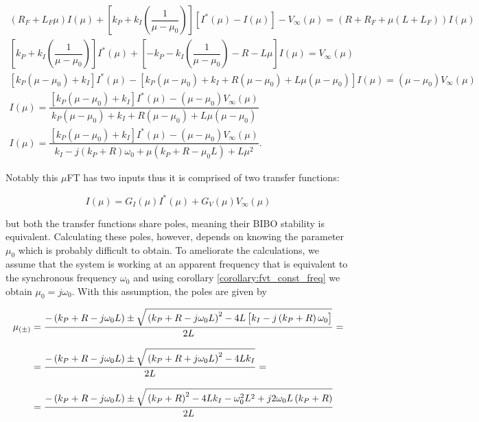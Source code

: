 \begin{gather}
	\left(R_F + L_F\mu\right)I(\mu) + \left[k_P + k_I\left(\dfrac{1}{\mu - \mu_0}\right)\right]\left[I^*(\mu) - I(\mu)\right] - V_\infty(\mu) = \left(R + R_F + \mu\left(L + L_F\right)\right)I(\mu) \nonumber\\[3mm]
	\left[k_P + k_I\left(\dfrac{1}{\mu - \mu_0}\right)\right]I^*(\mu) + \left[- k_P - k_I\left(\dfrac{1}{\mu - \mu_0}\right) - R - L\mu \right]I(\mu) = V_\infty(\mu) \nonumber\\[3mm]
	\left[k_P\left(\mu - \mu_0\right) + k_I\right]I^*(\mu) - \left[k_P\left(\mu - \mu_0\right) + k_I  + R\left(\mu - \mu_0\right) + L\mu\left(\mu - \mu_0\right)\right]I(\mu) = \left(\mu - \mu_0\right) V_\infty(\mu)   \nonumber\\[3mm]
	I(\mu) = \dfrac{\left[k_P\left(\mu - \mu_0\right) + k_I\right]I^*(\mu) - \left(\mu - \mu_0\right) V_\infty(\mu)}{k_P\left(\mu - \mu_0\right) + k_I  + R\left(\mu - \mu_0\right) + L\mu\left(\mu - \mu_0\right)} \nonumber\\[3mm]
	I(\mu) = \dfrac{\left[k_P\left(\mu - \mu_0\right) + k_I\right]I^*(\mu) - \left(\mu - \mu_0\right) V_\infty(\mu)}{ k_I - j \left(k_P + R\right) \omega_0 + \mu\left(k_P + R - \mu_0 L\right) + L\mu^2 } .\label{eq:dpo_i_mimo}
\end{gather}

	Notably this $\mu$FT has two inputs thus it is comprised of two transfer functions:

\begin{equation} I(\mu) = G_I(\mu) I^*(\mu) + G_V(\mu) V_\infty(\mu) \end{equation}

	\noindent but both the transfer functions share poles, meaning their BIBO stability is equivalent. Calculating these poles, however, depends on knowing the parameter $\mu_0$ which is probably difficult to obtain. To ameliorate the calculations, we assume that the system is working at an apparent frequency that is equivalent to the synchronous frequency $\omega_0$ and using corollary \ref{corollary:fvt_const_freq} we obtain $\mu_0 = j\omega_0$. With this assumption, the poles are given by

\begin{align}
	\mu_{(\pm)} &= \dfrac{-\left(k_P + R - j\omega_0 L\right) \pm \sqrt{\raisebox{3.5mm}{} \left(k_P + R - j\omega_0 L\right)^2 - 4L\left[\raisebox{3mm}{} k_I - j \left(k_P + R\right) \omega_0 \right]}}{2L} = \nonumber\\[3mm]
%
	            &= \dfrac{-\left(k_P + R - j\omega_0 L\right) \pm \sqrt{\raisebox{3.5mm}{} \left(k_P + R + j\omega_0 L\right)^2 - 4Lk_I}}{2L} = \nonumber\\[3mm]
%
	            &= \dfrac{-\left(k_P + R - j\omega_0 L\right) \pm \sqrt{\raisebox{3.5mm}{} \left(k_P + R\right)^2 - 4Lk_I - \omega_0^2L^2 + j2\omega_0 L \left(k_P + R\right)}}{2L} \label{eq:discriminant}
\end{align}

